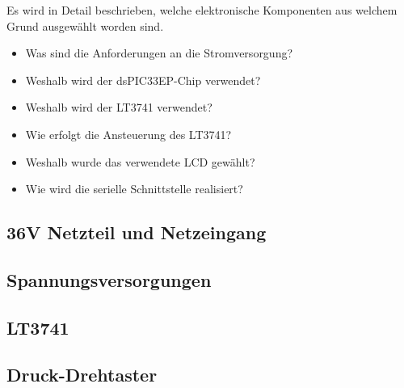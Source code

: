 Es wird  in  Detail  beschrieben,  welche  elektronische Komponenten aus welchem
Grund ausgew\"ahlt worden sind.

\begin{itemize}
    \item
        Was sind die Anforderungen an die Stromversorgung?
    \item
        Weshalb wird der dsPIC33EP-Chip verwendet?
    \item
        Weshalb wird der LT3741 verwendet?
    \item
        Wie erfolgt die Ansteuerung des LT3741?
    \item
        Weshalb wurde das verwendete LCD gew\"ahlt?
    \item
        Wie wird die serielle Schnittstelle realisiert?
\end{itemize}

\subsection{36V Netzteil und Netzeingang}



\subsection{Spannungsversorgungen}



\subsection{LT3741}



\subsection{Druck-Drehtaster}



